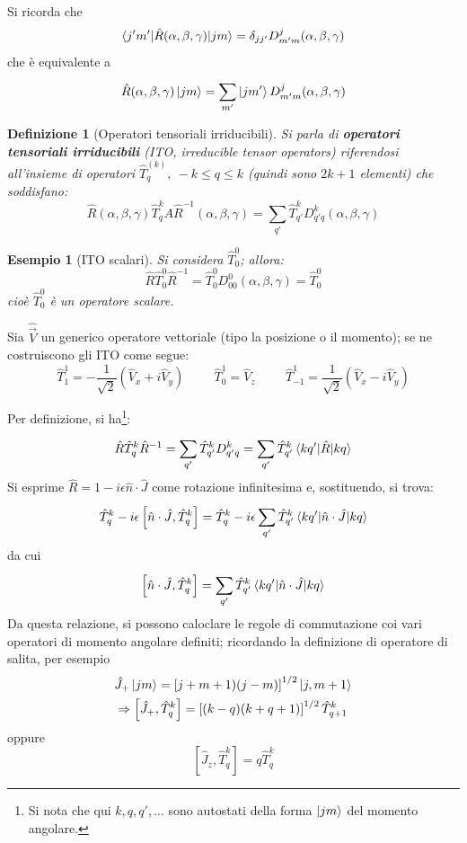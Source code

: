 \documentclass[11pt, a4paper]{scrartcl} %
\numberwithin{equation}{subsection}
\theoremstyle{style2}
\theoremstyle{style1}
\newtheorem{definizione}{Definizione}[section]
\newtheorem{esempio}{Esempio}[section]
\begin{document}
Si ricorda che 
\[
\braket{j'm'|\hat{R}(\alpha ,\beta ,\gamma)|jm}  = \delta _{jj'} D^j_{m'm} (\alpha, \beta ,\gamma)
\] 
che \`e equivalente a
\[
\hat{R}(\alpha ,\beta ,\gamma) \ket{jm} = \sum_{m'}^{} \ket{jm'} D^{j} _{m'm} (\alpha ,\beta ,\gamma)
\] 
\begin{definizione}[Operatori tensoriali irriducibili]
Si parla di \textbf{operatori tensoriali irriducibili} (ITO, \textit{irreducible tensor operators}) riferendosi all'insieme di operatori $\hat{T}^{(k)} _q ,\ -k\le q\le k$ (quindi sono $2k+1$ elementi) che soddisfano:
\begin{equation}
	\hat{R}(\alpha ,\beta ,\gamma) \hat{T}_q^{k} A \hat{R}^{-1} (\alpha ,\beta ,\gamma) = \sum_{q'}^{} \hat{T}_{q'}^kD^k _{q'q} (\alpha ,\beta ,\gamma)
\end{equation}
\end{definizione}
\begin{esempio}[ITO scalari]
	Si considera $\hat{T}^0_0$; allora:
	\[
	\hat{R}\hat{T}^0_0 \hat{R}^{-1} = \hat{T}^0_0D^0_{00} (\alpha ,\beta ,\gamma) = \hat{T}^0_0
	\] 
	cio\`e $\hat{T}^0_0$ \`e un operatore scalare.
\end{esempio}
Sia $\hat{\vec{V}}$ un generico operatore vettoriale (tipo la posizione o il momento); se ne costruiscono gli ITO come segue:
\begin{equation}
\hat{T}_1^1  = -\frac{1}{\sqrt{2} } \left(\hat{V}_x + i \hat{V}_y\right)  \hspace{1cm} \hat{T}^1_0 = \hat{V}_z \hspace{1cm} \hat{T}^1_{-1} = \frac{1}{\sqrt{2} }\left(\hat{V}_x - i\hat{V}_y\right) 
\end{equation}

Per definizione, si ha\footnote{Si nota che qui $k,q,q',\ldots$ sono autostati della forma $\ket{jm} $ del momento angolare.}:
\[
\hat{R}\hat{T}_q^k \hat{R}^{-1} = \sum_{q'}^{} \hat{T}^k_{q'} D^k_{q'q} = \sum_{q'}^{} \hat{T}^k_{q'} \braket{kq'|\hat{R}|kq} 
\] 
Si esprime $\hat{R}= 1 - i \epsilon \hat{n}\cdot \hat{J}$ come rotazione infinitesima e, sostituendo, si trova:
\[
\hat{T}^k _q - i \epsilon \left[ \hat{n}\cdot \hat{J}, \hat{T}^k_q \right] = \hat{T}^k_q - i \epsilon  \sum_{q'}^{} \hat{T}^k_{q'} \braket{kq'|\hat{n}\cdot \hat{J}|kq} 
\] 
da cui
\begin{equation}
	\left[ \hat{n}\cdot \hat{J}, \hat{T}^k_q \right] = \sum_{q'}^{} \hat{T}^k_{q'} \braket{kq'|\hat{n}\cdot \hat{J}|kq} 
\end{equation}
Da questa relazione, si possono caloclare le regole di commutazione coi vari operatori di momento angolare definiti; ricordando la definizione di operatore di salita, per esempio
\[
	\begin{split}
		&\hat{J}_+ \ket{jm} = \left[ j+m+1)(j-m) \right] ^{1 / 2} \ket{j,m+1} \\
		&\Rightarrow \left[ \hat{J}_+, \hat{T}_q^k \right] = \left[ (k-q)(k+q+1) \right] ^{1 / 2}  \hat{T}^k _{q+1} 
	\end{split}
\] 
oppure
\[
	 \left[ \hat{J}_z , \hat{T}^k_q \right] =  q \hat{T}^{k} _q
\] 
\end{document}
